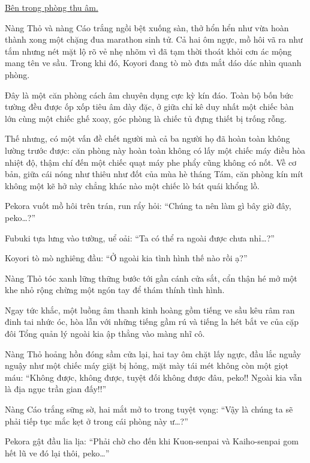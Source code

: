 \documentclass[../main.tex]{subfiles}
\begin{document}
\pov{-}

\begin{center}
  \uline{Bên trong phòng thu âm.}
\end{center}

Nàng Thỏ và nàng Cáo trắng ngồi bệt xuống sàn, thở hổn hển như vừa hoàn thành xong một chặng đua marathon sinh tử. Cả hai ôm ngực, mồ hôi vã ra như tắm nhưng nét mặt lộ rõ vẻ nhẹ nhõm vì đã tạm thời thoát khỏi cơn ác mộng mang tên ve sầu. Trong khi đó, Koyori đang tò mò đưa mắt dáo dác nhìn quanh phòng.


Đây là một căn phòng cách âm chuyên dụng cực kỳ kín đáo. Toàn bộ bốn bức tường đều được ốp xốp tiêu âm dày đặc, ở giữa chỉ kê duy nhất một chiếc bàn lớn cùng một chiếc ghế xoay, góc phòng là chiếc tủ đựng thiết bị trống rỗng.

Thế nhưng, có một vấn đề chết người mà cả ba người họ đã hoàn toàn không lường trước được: căn phòng này hoàn toàn không có lấy một chiếc máy điều hòa nhiệt độ, thậm chí đến một chiếc quạt máy phe phẩy cũng không có nốt. Về cơ bản, giữa cái nóng như thiêu như đốt của mùa hè tháng Tám, căn phòng kín mít không một kẽ hở này chẳng khác nào một chiếc lò bát quái khổng lồ.

Pekora vuốt mồ hôi trên trán, run rẩy hỏi: ``Chúng ta nên làm gì bây giờ đây, peko\dots?''

Fubuki tựa lưng vào tường, uể oải: ``Ta có thể ra ngoài được chưa nhỉ\dots?''

Koyori tò mò nghiêng đầu: ``Ở ngoài kia tình hình thế nào rồi ạ?''

Nàng Thỏ tóc xanh lững thững bước tới gần cánh cửa sắt, cẩn thận hé mở một khe nhỏ rộng chừng một ngón tay để thám thính tình hình.

Ngay tức khắc, một luồng âm thanh kinh hoàng gồm tiếng ve sầu kêu râm ran đinh tai nhức óc, hòa lẫn với những tiếng gầm rú và tiếng la hét bắt ve của cặp đôi Tổng quản lý ngoài kia ập thẳng vào màng nhĩ cô.

Nàng Thỏ hoảng hồn đóng sầm cửa lại, hai tay ôm chặt lấy ngực, đầu lắc nguầy nguậy như một chiếc máy giặt bị hỏng, mặt mày tái mét không còn một giọt máu: ``Không được, không được, tuyệt đối không được đâu, peko!! Ngoài kia vẫn là địa ngục trần gian đấy!!''

Nàng Cáo trắng sững sờ, hai mắt mở to trong tuyệt vọng: ``Vậy là chúng ta sẽ phải tiếp tục mắc kẹt ở trong cái phòng này ư\dots?''

Pekora gật đầu lia lịa: ``Phải chờ cho đến khi Kuon-senpai và Kaiho-senpai gom hết lũ ve đó lại thôi, peko\dots''
\end{document}
